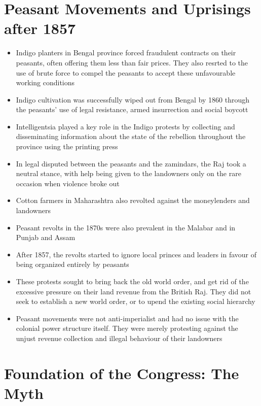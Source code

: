 \section{Peasant Movements and Uprisings after 1857}
\begin{itemize}
    \item Indigo planters in Bengal province forced fraudulent contracts on their peasants, often offering them less than fair prices. They also resrted to the use of brute force to compel the peasants to accept these unfavourable working conditions
    \item Indigo cultivation was successfully wiped out from Bengal by 1860 through the peasants' use of legal resistance, armed insurrection and social boycott
    \item Intelligentsia played a key role in the Indigo protests by collecting and disseminating information about the state of the rebellion throughout the province using the printing press
    \item In legal disputed between the peasants and the \glspl{zamindar}, the Raj took a neutral stance, with help being given to the landowners only on the rare occasion when violence broke out
    \item Cotton farmers in Maharashtra also revolted against the moneylenders and landowners
    \item Peasant revolts in the 1870s were also prevalent in the Malabar and in Punjab and Assam
    \item After 1857, the revolts started to ignore local princes and leaders in favour of being organized entirely by peasants
    \item These protests sought to bring back the old world order, and get rid of the excessive pressure on their land revenue from the British Raj. They did not seek to establish a new world order, or to  upend the existing social hierarchy
    \item Peasant movements were not anti-imperialist and had no issue with the colonial power structure itself. They were merely protesting against the unjust revenue collection and illegal behaviour of their landowners
\end{itemize}


\section{Foundation of the Congress: The Myth}

